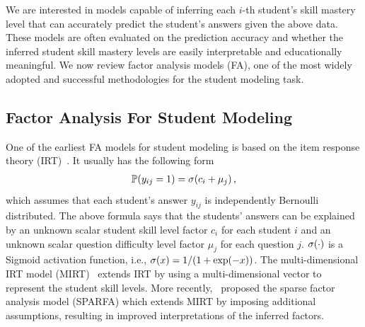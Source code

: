 We are interested in models capable of inferring each $i$-th student's skill
mastery level that can accurately predict the student's answers given the above
data. These models are often evaluated on the prediction accuracy and whether
the inferred student skill mastery levels are easily interpretable and
educationally meaningful. We now review factor analysis models (FA), one of the
most widely adopted and successful methodologies for the student modeling task.

\subsection{Factor Analysis For Student Modeling}
\label{sec:fa}
% 
One of the earliest FA models for student modeling is based on the item response
theory (IRT)~\cite{irt}. It usually has the following form
\begin{align}
    \begin{split}
        \mathbb{P}(y_{ij}=1) = \sigma(c_i + \mu_j)\,,\label{eq:irt}
    \end{split}
\end{align}
which assumes that each student's answer $y_{ij}$ is independently Bernoulli distributed. The above formula says that the students' answers can be explained by an unknown scalar student skill level factor $c_i$ for each student $i$ and an unknown scalar question difficulty level factor $\mu_j$ for each question $j$. $\sigma(\cdot)$ is a Sigmoid activation function, i.e., $\sigma(x) = 1 / (1 + {\rm exp}(-x))$. The multi-dimensional IRT model (MIRT)~\cite{mirt} extends IRT by using a multi-dimensional vector to represent the student skill levels. More recently,~\cite{lan14a} proposed the sparse factor analysis model (SPARFA) which extends MIRT by imposing additional assumptions, resulting in improved interpretations of the inferred factors.

